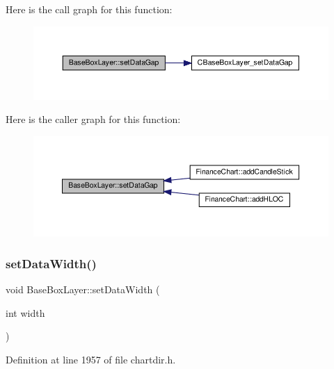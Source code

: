 Here is the call graph for this function\+:
\nopagebreak
\begin{figure}[H]
\begin{center}
\leavevmode
\includegraphics[width=350pt]{class_base_box_layer_a1d7193833d5c13dda5fa30ca431c72f5_cgraph}
\end{center}
\end{figure}
Here is the caller graph for this function\+:
\nopagebreak
\begin{figure}[H]
\begin{center}
\leavevmode
\includegraphics[width=350pt]{class_base_box_layer_a1d7193833d5c13dda5fa30ca431c72f5_icgraph}
\end{center}
\end{figure}
\mbox{\label{class_base_box_layer_a49c2e59633573b52f02e399bec37b46e}} 
\subsubsection{\texorpdfstring{set\+Data\+Width()}{setDataWidth()}}
{\footnotesize\ttfamily void Base\+Box\+Layer\+::set\+Data\+Width (\begin{DoxyParamCaption}\item[{int}]{width }\end{DoxyParamCaption})\hspace{0.3cm}{\ttfamily [inline]}}



Definition at line 1957 of file chartdir.\+h.

